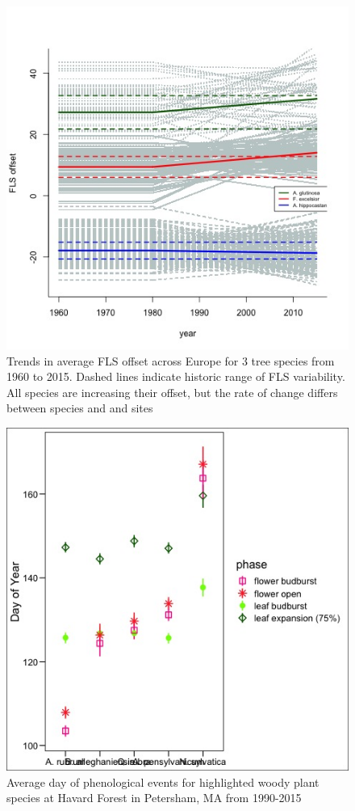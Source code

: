 \documentclass[12pt]{article}\usepackage[]{graphicx}\usepackage[]{color}
\begin{document}
\begin{figure}
    \centering
 \includegraphics[width=\textwidth]{..//figure/FLS_climate_change.jpeg} 
    \caption{Trends in average FLS offset across Europe for 3 tree species from 1960 to 2015. Dashed lines indicate historic range of FLS variability. All species are increasing their offset, but the rate of change differs between species and and sites}
    \label{fig:Figure 1}
\end{figure}
\begin{figure}
    \centering
    \includegraphics[width=.8\textwidth]{..//figure/HFmeans.jpeg}
    \caption{Average day of phenological events for highlighted woody plant species at Havard Forest in Petersham, MA from 1990-2015}
    \label{fig:Figure 2}
\end{figure}
\end{document}
